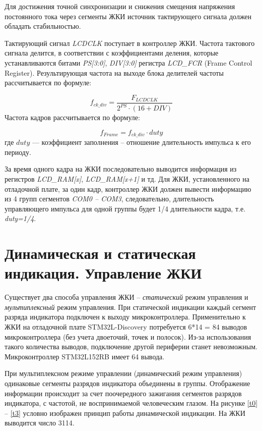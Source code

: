 Для достижения точной синхронизации и снижения смещения напряжения постоянного тока через сегменты ЖКИ источник тактирующего сигнала должен обладать стабильностью. 

Тактирующий сигнал \textit{LCDCLK} поступает в контроллер ЖКИ. Частота тактового сигнала делится, в соответствии с коэффициентами деления, которые устанавливаются битами \textit{PS[3:0]}, \textit{DIV[3:0]} регистра \textit{LCD\_FCR }(Frame Control Register). Результирующая частота на выходе блока делителей частоты рассчитывается по формуле:


\[f_{ck\_div}=\frac{F_{LCDCLK}}{2^{PS}\cdot(16+DIV)}\]
Частота кадров рассчитывается по формуле:

\[ f_{Frame}=f_{ck\_div}\cdot duty\]
где $duty$ --- коэффициент заполнения -- отношение длительность импульса к его периоду. 

За время одного кадра на ЖКИ последовательно выводится информация из регистров \textit{LCD\_RAM[x]}, \textit{LCD\_RAM[x+1]} и тд. Для ЖКИ, установленного на отладочной плате, за один кадр, контроллер ЖКИ должен вывести информацию из 4 групп сегментов \textit{COM0 -- COM3}, следовательно, длительность управляющего импульса для одной группы будет 1/4 длительности кадра, т.е. \textit{duty=1/4}. 

\section{Динамическая и статическая индикация. Управление ЖКИ}

Существует два способа управления ЖКИ -- \textit{статический} режим управления и \textit{мультиплексный}\cite{gost25} режим управления. При статической индикации каждый сегмент разряда индикатора подключен к выходу микроконтроллера. Применительно к ЖКИ на отладочной плате STM32L-Discovery потребуется 6*14 = 84 выводов микроконтроллера (без учета двоеточий, точек и полосок). Из-за использования такого количества выводов, подключение другой периферии станет невозможным. Микроконтроллер STM32L152RB имеет 64 вывода.
	
	При мультиплексном режиме управлении (динамический режим управления) одинаковые сегменты разрядов индикатора объединены в группы. Отображение информации происходит за счет поочередного зажигания сегментов разрядов индикатора, с частотой, не воспринимаемой человеческим глазом. На рисунке \ref{t0} -- \ref{t3} условно изображен принцип работы динамической индикации. На ЖКИ выводится число 3114.


